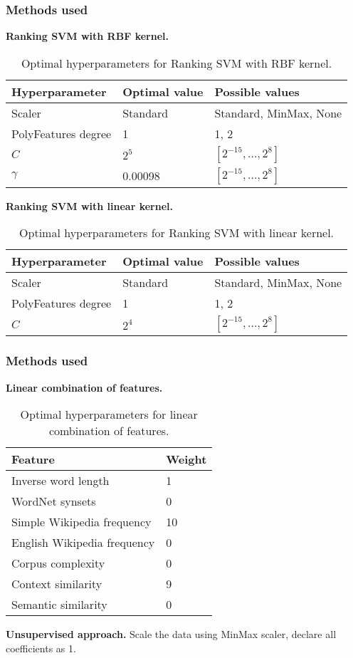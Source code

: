 \documentclass[utf8]{beamer}
\begin{document}
\begin{frame}
\frametitle{Methods used}
\textbf{Ranking SVM with RBF kernel.}

\begin{table}
\caption{Optimal hyperparameters for Ranking SVM with RBF kernel.}
\label{tab:rbf-params}
\begin{center}
\begin{tabular}{l | l | l}
Hyperparameter & Optimal value & Possible values \\
\hline \hline
Scaler & Standard &  Standard, MinMax, None \\
PolyFeatures degree & 1 & 1, 2  \\
$C$ & $2^5$ & $[2^{-15}, ..., 2^{8}]$ \\
$\gamma$ & 0.00098 & $[2^{-15}, ..., 2^{8}]$ \\
\end{tabular}
\end{center}
\end{table}

\textbf{Ranking SVM with linear kernel.}

\begin{table}
\caption{Optimal hyperparameters for Ranking SVM with linear kernel.}
\label{tab:rbf-params}
\begin{center}
\begin{tabular}{l | l | l}
Hyperparameter & Optimal value & Possible values \\
\hline \hline
Scaler & Standard &  Standard, MinMax, None \\
PolyFeatures degree & 1 & 1, 2  \\
$C$ & $2^4$ & $[2^{-15}, ..., 2^{8}]$
\end{tabular}
\end{center}
\end{table}
\end{frame}

\begin{frame}
\frametitle{Methods used}
\textbf{Linear combination of features.}

\begin{table}
\caption{Optimal hyperparameters for linear combination of features.}
\label{tab:linear-params}
\begin{center}
\begin{tabular}{l | l}
Feature & Weight \\
\hline \hline
Inverse word length & 1 \\
WordNet synsets & 0 \\
Simple Wikipedia frequency & 10 \\
English Wikipedia frequency & 0 \\
Corpus complexity & 0 \\
Context similarity & 9 \\
Semantic similarity & 0 \\
\end{tabular}
\end{center}
\end{table}

\textbf{Unsupervised approach.} Scale the data using MinMax scaler, declare all coefficients as 1.
\end{frame}
\end{document}
